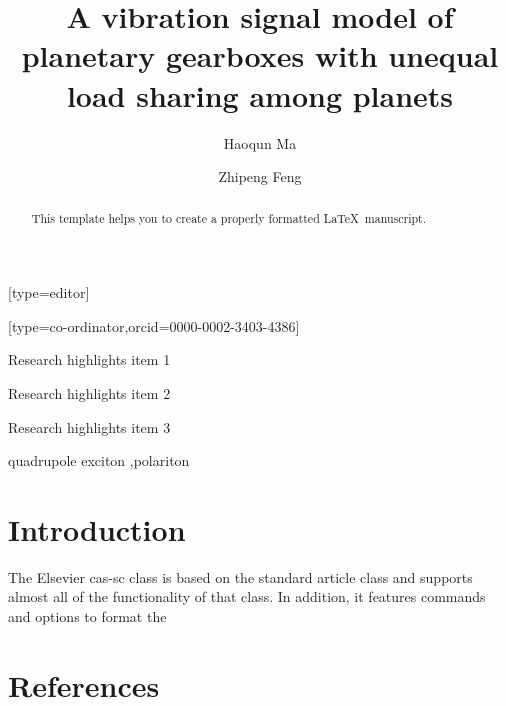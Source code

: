 \documentclass[a4paper,fleqn]{cas-sc}
\begin{document}
\let\WriteBookmarks\relax
\def\floatpagepagefraction{1}
\def\textpagefraction{.001}

\title[mode = title]{A vibration signal model of planetary gearboxes with unequal load sharing among planets}
\author[1]{Haoqun Ma}[type=editor]
\address[1]{University of Science and Technology Beijing, No.30, Xueyuan Road, Haidian District, Beijing.}
\author[1]{Zhipeng Feng}[type=co-ordinator,orcid=0000-0002-3403-4386]
\cormark[1]
\begin{abstract}
    This template helps you to create a properly formatted \LaTeX\ manuscript.
\end{abstract}
\begin{highlights}
    \item Research highlights item 1
    \item Research highlights item 2
    \item Research highlights item 3
\end{highlights}
\begin{keywords}
    quadrupole exciton \sep polariton
\end{keywords}
    
\maketitle
\section{Introduction}

The Elsevier cas-sc class is based on the
standard article class and supports almost all of the functionality of
that class. In addition, it features commands and options to format the
\section*{References}


\end{document}
